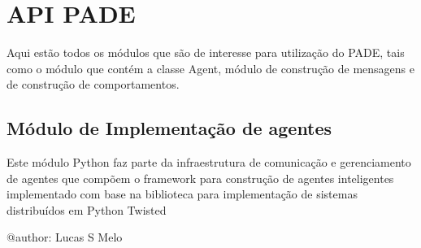 \documentclass[letterpaper,10pt,brazil]{sphinxmanual}
\begin{document}
\section{API PADE}
\label{api::doc}\label{api:api-pade}
Aqui estão todos os módulos que são de interesse para utilização do PADE, tais como o módulo que contém a classe Agent, módulo de construção de mensagens e de construção de comportamentos.
\label{api:module-pade.core.agent}

\subsection{Módulo de Implementação de agentes}
\label{api:modulo-de-implementacao-de-agentes}
Este módulo Python faz parte da infraestrutura de comunicação
e gerenciamento de agentes que compõem o framework para construção
de agentes inteligentes implementado com base na biblioteca para
implementação de sistemas distribuídos em Python Twisted

@author: Lucas S Melo
\end{document}
